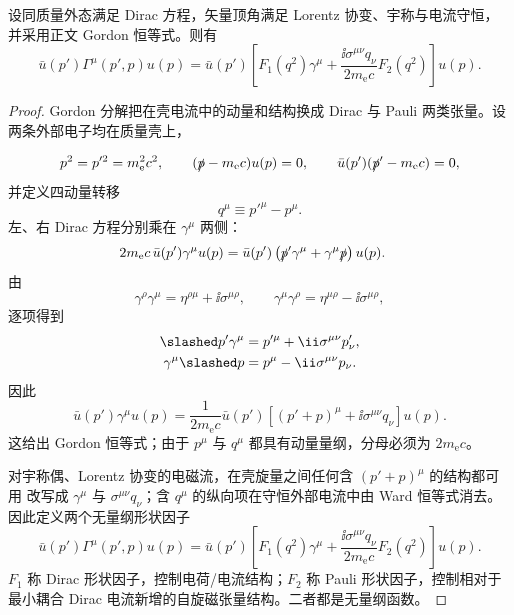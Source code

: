 \begin{proposition}[在壳矢量顶角的独立张量基]
设同质量外态满足 Dirac 方程，矢量顶角满足 Lorentz 协变、宇称与电流守恒，并采用正文 Gordon 恒等式。则有
\begin{equation}
 {
 \bar u(p')\Gamma^\mu(p',p)u(p)
 =\bar u(p')\left[
 F_1(q^2)\gamma^\mu
 +\frac{\ii\sigma^{\mu\nu}q_\nu}{2m_{\mathrm e} c}F_2(q^2)
 \right]u(p).}
\label{eq:form-factor-definition-r14}
\end{equation}
\end{proposition}
\begin{proof}
Gordon 分解把在壳电流中的动量和结构换成 Dirac 与 Pauli 两类张量。设两条外部电子均在质量壳上，

\begin{equation*}
 p^2=p'^2=m_{\mathrm e}^2c^2,
 \qquad
 (\slashed p-m_{\mathrm e} c)u(p)=0,
 \qquad
 \bar u(p')(\slashed p'-m_{\mathrm e} c)=0,
\end{equation*}
并定义四动量转移
\begin{equation*}
 q^\mu\equiv p'^\mu-p^\mu.
\end{equation*}
左、右 Dirac 方程分别乘在 $\gamma^\mu$ 两侧：
\begin{align*}
 2m_{\mathrm e} c\,\bar u(p')\gamma^\mu u(p)
 &=\bar u(p')\left(\slashed p'\gamma^\mu+\gamma^\mu\slashed p\right)u(p).
\end{align*}
由
\begin{equation*}
 \gamma^\rho\gamma^\mu
 =\eta^{\rho\mu}+\ii\sigma^{\mu\rho},
 \qquad
 \gamma^\mu\gamma^\rho
 =\eta^{\mu\rho}-\ii\sigma^{\mu\rho},
\end{equation*}
逐项得到
\begin{align*}
 \slashed p'\gamma^\mu
 &=p'^\mu+\ii\sigma^{\mu\nu}p'_\nu,\\
 \gamma^\mu\slashed p
 &=p^\mu-\ii\sigma^{\mu\nu}p_\nu.
\end{align*}
因此
\begin{equation*}
 {
 \bar u(p')\gamma^\mu u(p)
 =\frac1{2m_{\mathrm e} c}\bar u(p')
 \left[(p'+p)^\mu+\ii\sigma^{\mu\nu}q_\nu\right]u(p).}
 \end{equation*}
这给出 Gordon 恒等式；由于 $p^\mu$ 与 $q^\mu$ 都具有动量量纲，分母必须为 $2m_{\mathrm e} c$。

对宇称偶、Lorentz 协变的电磁流，在壳旋量之间任何含 $(p'+p)^\mu$ 的结构都可用  改写成 $\gamma^\mu$ 与 $\sigma^{\mu\nu}q_\nu$；含 $q^\mu$ 的纵向项在守恒外部电流中由 Ward 恒等式消去。因此定义两个无量纲形状因子
\begin{equation*}
 {
 \bar u(p')\Gamma^\mu(p',p)u(p)
 =\bar u(p')\left[
 F_1(q^2)\gamma^\mu
 +\frac{\ii\sigma^{\mu\nu}q_\nu}{2m_{\mathrm e} c}F_2(q^2)
 \right]u(p).}
 \end{equation*}
$F_1$ 称 Dirac 形状因子，控制电荷/电流结构；$F_2$ 称 Pauli 形状因子，控制相对于最小耦合 Dirac 电流新增的自旋磁张量结构。二者都是无量纲函数。
\end{proof}

